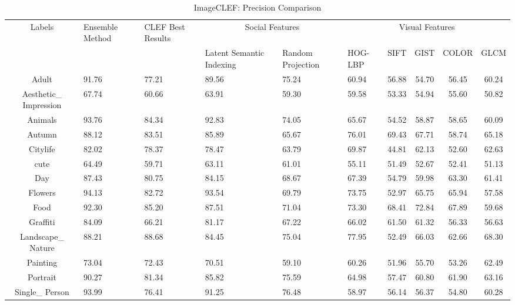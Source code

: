 \begin{sidewaystable}
\caption{ ImageCLEF: Precision Comparison} %
\vspace*{0.2 cm}
\begin{tabular}{|c| p{2cm}| p{2cm}| p{2cm}| p{2cm}| p{2cm}|c|c|c|c|} %
Labels  & Ensemble Method  & CLEF Best Results & \multicolumn{2}{c}{Social Features}  & \multicolumn{5}{c}{Visual Features}\\ [0.5ex] 
 &  & & Latent Semantic Indexing & Random Projection & HOG-LBP & SIFT & GIST & COLOR & GLCM \\  [1ex] \hline
  
Adult & 91.76 & 77.21 & 89.56 & 75.24 & 60.94 & 56.88 & 54.70 & 56.45 & 60.24\\  [1ex]
Aesthetic\_ Impression & 67.74 & 60.66 & 63.91 & 59.30 & 59.58 & 53.33 & 54.94 & 55.60 & 50.82 \\  [1ex]
Animals & 93.76 & 84.34 & 92.83 & 74.05 & 65.67 & 54.52 & 58.87 & 58.65 & 60.09\\  [1ex]
Autumn & 88.12 & 83.51 & 85.89 & 65.67 & 76.01 & 69.43 & 67.71 & 58.74 & 65.18\\  [1ex]
Citylife & 82.02 & 78.37 & 78.47 & 63.79 & 69.87 & 44.81 & 62.13 & 52.60 & 62.63\\  [1ex]
cute & 64.49 & 59.71 & 63.11 & 61.01 & 55.11 & 51.49 & 52.67 & 52.41 & 51.13\\  [1ex]
Day & 87.43 & 80.75 & 84.15 & 68.67 & 67.39 & 54.79 & 59.98 & 63.30 & 61.41\\  [1ex]
Flowers & 94.13 & 82.72 & 93.54 & 69.79 & 73.75 & 52.97 & 65.75 & 65.94 & 57.58\\  [1ex]
Food & 92.30 & 85.20 & 87.51 & 71.04 & 73.30 & 68.41 & 72.84 & 67.89 & 59.68\\  [1ex]
Graffiti & 84.09 & 66.21 & 81.17 & 67.22 & 66.02 & 61.50 & 61.32 & 56.33 & 56.63\\  [1ex]
Landscape\_ Nature & 88.21 & 88.68 & 84.45 & 75.04 & 77.95 & 52.49 & 66.03 & 62.66 & 68.30\\  [1ex]
Painting & 73.04 & 72.43 & 70.51 & 59.10 & 60.26 & 51.96 & 55.70 & 53.26 & 62.49\\  [1ex]
Portrait & 90.27 & 81.34 & 85.82 & 75.59 & 64.98 & 57.47 & 60.80 & 61.90 & 63.16\\  [1ex]
Single\_ Person & 93.99 & 76.41 & 91.25 & 76.48 & 58.97 & 56.14 & 56.37 & 54.80 & 60.28\\  [1ex]

\end{tabular}
\end{sidewaystable}

